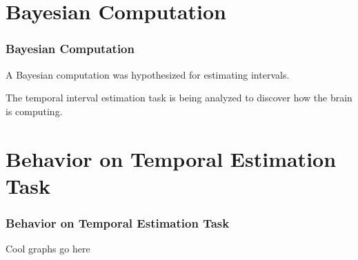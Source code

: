\documentclass{beamer}
\begin{document}

\section{Bayesian Computation}
\begin{frame}
\frametitle{\textbf{Bayesian Computation} }
A Bayesian computation was hypothesized for estimating intervals.


The temporal interval estimation task is being analyzed to discover how the brain is computing.

\end{frame}


\section{Behavior on Temporal Estimation Task}
\begin{frame}
\frametitle{\textbf{Behavior on Temporal Estimation Task} }

Cool graphs go here

\end{frame}

\end{document}
